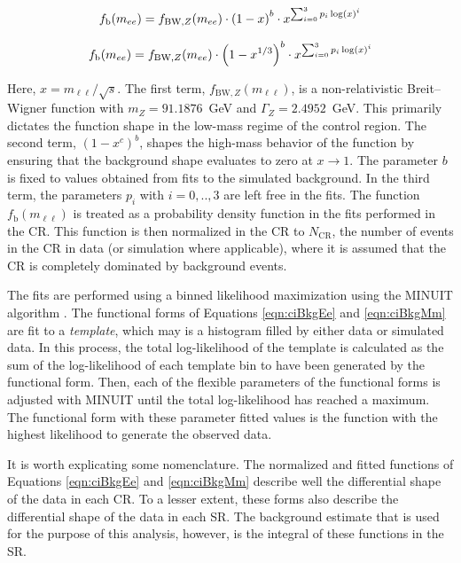 \begin{equation}\begin{split} \label{eqn:ciBkgEe}
f_\textrm{b}(m_{ee}) &= f_{\mathrm{BW},Z}(m_{ee}) \cdot \left(1 - x\right)^{b} \cdot x^{\sum_{i=0}^3 p_i\log(x)^i} \\
\end{split}\end{equation} 

\begin{equation}\begin{split}\label{eqn:ciBkgMm}
f_\textrm{b}(m_{ee}) &= f_{\mathrm{BW},Z}(m_{ee}) \cdot \left(1 - x^{1/3}\right)^{b} \cdot x^{\sum_{i=0}^3 p_i\log(x)^i} \\
\end{split}\end{equation} 

Here, $x = m_{\ell\ell}/\sqrt{s}$.
The first term, $f_{\mathrm{BW},Z}(m_{\ell\ell})$, is a non-relativistic Breit--Wigner function with $m_Z = 91.1876$~GeV and $\Gamma_Z = 2.4952$~GeV.
This primarily dictates the function shape in the low-mass regime of the control region.
The second term, $(1-x^{c})^{b}$, shapes the high-mass behavior of the function by ensuring that the background shape evaluates to zero at $x\to 1$.
The parameter $b$ is fixed to values obtained from fits to the simulated background.
In the third term, the parameters $p_i$ with $i=0,..,3$ are left free in the fits.
The function $f_\textrm{b}(m_{\ell\ell})$ is treated as a probability density function in the fits performed in the CR.
This function is then normalized in the CR to $N_\textrm{CR}$, the number of events in the CR in data (or simulation where applicable), where it is assumed that the CR is completely dominated by background events.

The fits are performed using a binned likelihood maximization using the MINUIT algorithm \cite{minuit}.
The functional forms of Equations \ref{eqn:ciBkgEe} and \ref{eqn:ciBkgMm} are fit to a \emph{template}, which may is a histogram filled by either data or simulated data.
In this process, the total log-likelihood of the template is calculated as the sum of the log-likelihood of each template bin to have been generated by the functional form.
Then, each of the flexible parameters of the functional forms is adjusted with MINUIT until the total log-likelihood has reached a maximum.
The functional form with these parameter fitted values is the function with the highest likelihood to generate the observed data.

It is worth explicating some nomenclature. 
The normalized and fitted functions of Equations \ref{eqn:ciBkgEe} and \ref{eqn:ciBkgMm} describe well the differential shape of the data in each CR.
To a lesser extent, these forms also describe the differential shape of the data in each SR.
The background estimate that is used for the purpose of this analysis, however, is the integral of these functions in the SR.


